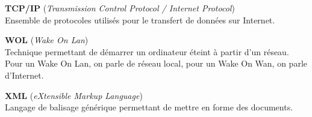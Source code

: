 \textbf{TCP/IP} (\textit{Transmission Control Protocol / Internet Protocol})\\
Ensemble de protocoles utilis\'es pour le transfert de donn\'ees sur Internet.

\vspace{0.5cm}

\textbf{WOL} (\textit{Wake On Lan})\\
Technique permettant de d\'emarrer un ordinateur \'eteint \`a partir d'un r\'eseau. 
Pour un Wake On Lan, on parle de r\'eseau local, pour un Wake On Wan, on parle d'Internet.

\vspace{0.5cm}

\textbf{XML} (\textit{eXtensible Markup Language})\\
Langage de balisage g\'en\'erique permettant de mettre en forme des documents.



\clearpage
